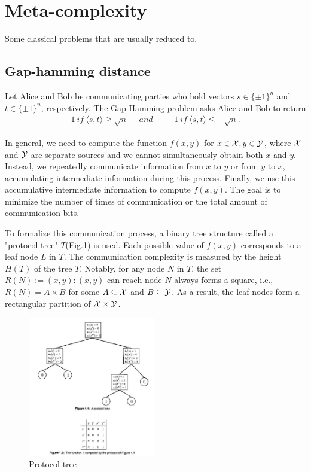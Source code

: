 \documentclass[10pt]{book}
\begin{document}
\section{Meta-complexity}
Some classical problems that are usually reduced to.
\subsection{Gap-hamming distance}
\begin{prob}
\label{ghd}
     Let Alice and Bob be communicating parties who hold vectors $s\in\{\pm1\}^n$ and $t\in\{\pm1\}^n$, respectively. The Gap-Hamming problem asks Alice and Bob to return
     \begin{align*}
         1~if~\langle s,t \rangle\ge \sqrt{n}~~~~~~and~~~~~~-1~if~\langle s,t \rangle\le -\sqrt{n}.
     \end{align*}
\end{prob}



In general, we need to compute the function $f(x,y)$ for $x\in \mathcal{X}, y\in\mathcal{Y}$, where $\mathcal{X}$ and $\mathcal{Y}$ are separate sources and we cannot simultaneously obtain both $x$ and $y$. Instead, we repeatedly communicate information from $x$ to $y$ or from $y$ to $x$, accumulating intermediate information during this process. Finally, we use this accumulative intermediate information to compute $f(x,y)$. The goal is to minimize the number of times of communication or the total amount of communication bits.

To formalize this communication process, a binary tree structure called a "protocol tree" $T$(Fig.\ref{proto_tree}) is used. Each possible value of $f(x,y)$ corresponds to a leaf node $L$ in $T$. The communication complexity is measured by the height $H(T)$ of the tree $T$. Notably, for any node $N$ in $T$, the set $R(N):={(x,y):(x,y)\text{ can reach node $N$}}$ always forms a square, i.e., $R(N)=A\times B$ for some $A\subseteq\mathcal{X}$ and $B\subseteq\mathcal{Y}$. As a result, the leaf nodes form a rectangular partition of $\mathcal{X}\times\mathcal{Y}$.

\begin{figure}
  \centering
  \includegraphics[width=0.5\textwidth]{protocol_tree.png}
  \caption{Protocol tree\cite{kushilevitz1997communication}}
  \label{proto_tree}
\end{figure}
\end{document}

